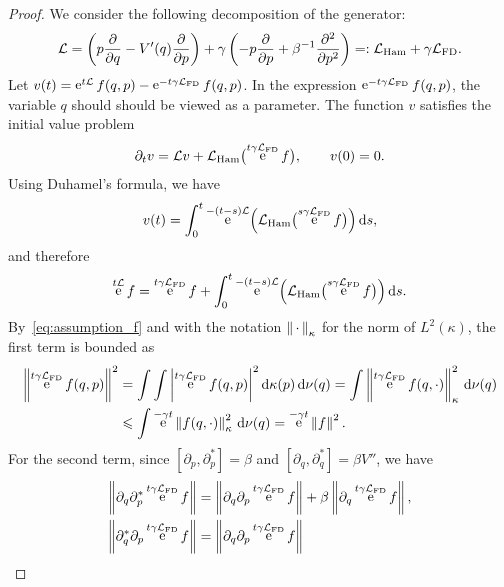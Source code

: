 \documentclass[11pt,a4paper]{article}
\DeclareMathOperator{\e}{e}
\newcommand{\commut}[2]{[#1, #2]}
\newcommand{\dummy}{\,\cdot\,}
\renewcommand{\d}{\mathrm d}
\theoremstyle{plain}
\numberwithin{equation}{section}
\renewcommand{\leq}{\leqslant}
\begin{document}
\begin{proof}
    We consider the following decomposition of the generator:
    \[
        \mathcal L
        = \left( p \derivative{1}{q} - \derivative*{1}[V]{q}(q) \derivative{1}{p} \right)
        + \gamma \left( - p \derivative{1}{p} + \beta^{-1} \derivative{2}{p^2} \right)
        =: \mathcal L_{\rm Ham} + \gamma \mathcal L_{\rm FD}.
    \]
    Let $v(t) = \e^{t \mathcal L} f(q, p) - \e^{- t \gamma \mathcal L_{\rm FD}} f(q, p)$.
    In the expression $\e^{- t \gamma \mathcal L_{\rm FD}} f(q, p)$,
    the variable $q$ should should be viewed as a parameter.
    The function $v$ satisfies the initial value problem
    \[
        \partial_t v = \mathcal L v +  \mathcal L_{\rm Ham} \bigl(\e^{t \gamma \mathcal L_{\rm FD}} f\bigr), \qquad v(0) = 0.
    \]
    Using Duhamel's formula, we have
    \[
        v(t) = \int_{0}^{t} \e^{- (t-s) \mathcal L}  \Bigl( \mathcal L_{\rm Ham} \bigl(\e^{s \gamma \mathcal L_{\rm FD}} f\bigr) \Bigr) \, \d s,
    \]
    and therefore
    \begin{equation}
        \label{eq:intermediate_decay_correlation}
        \e^{t \mathcal L} f =  \e^{t \gamma \mathcal L_{\rm FD}} f
        + \int_{0}^{t} \e^{- (t-s) \mathcal L}  \Bigl( \mathcal L_{\rm Ham} \bigl(\e^{s \gamma \mathcal L_{\rm FD}} f\bigr) \Bigr) \, \d s.
    \end{equation}
    By~\eqref{eq:assumption_f} and with the notation $\norm{\dummy}[\kappa]$ for the norm of $L^2(\kappa)$,
    the first term is bounded as
    \begin{align*}
        \norm{\e^{t \gamma \mathcal L_{\rm FD}} f(q, p)}^2
        &= \int \int  \abs{\e^{t \gamma \mathcal L_{\rm FD}} f(q, p) }^2 \d \kappa(p) \,\d \nu(q)
        = \int \norm{\e^{t \gamma \mathcal L_{\rm FD}} f(q, \cdot) }[\kappa]^2 \, \d \nu(q) \\
        &\leq \int \e^{-\gamma t} \norm{f(q, \cdot) }[\kappa]^2 \, \d \nu(q) = \e^{-\gamma t} \norm{f}^2.
    \end{align*}
    For the second term, since $\commut{\partial_p}{\partial_p^*} = \beta$ and $\commut{\partial_q}{\partial_q^*} = \beta V''$,
    we have
    \begin{align*}
        \norm{\partial_q \partial_p^* \e^{t \gamma \mathcal L_{\rm FD}} f}
        &= \norm{\partial_q \partial_p \e^{t \gamma \mathcal L_{\rm FD}} f} + \beta \norm{\partial_q \e^{t \gamma \mathcal L_{\rm FD}} f}, \\
        \norm{\partial_q^* \partial_p \e^{t \gamma \mathcal L_{\rm FD}} f}
        &= \norm{\partial_q \partial_p \e^{t \gamma \mathcal L_{\rm FD}} f}

\end{align*}
\end{proof}
\end{document}
